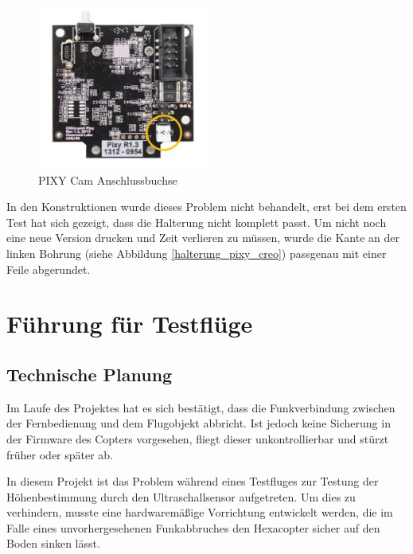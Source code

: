 			\begin{figure}[H]
			\begin{centering}
			\includegraphics[width = 0.5\textwidth]{Bilder/PIXY_Cam_Hinterseite}
			\par\end{centering}
			\caption[PIXY Cam Anschlussbuchse]{PIXY Cam Anschlussbuchse\cite{PIXY_Cmu_cam5}}
			\label{PIXY_Cam_Hinterseite}
			\end{figure}

	In den Konstruktionen wurde dieses Problem nicht behandelt, erst bei dem ersten Test hat sich gezeigt, dass die Halterung nicht komplett passt.
	Um nicht noch eine neue Version drucken und Zeit verlieren zu müssen, wurde die Kante an der linken Bohrung (siehe Abbildung \ref{halterung_pixy_creo}) passgenau mit einer Feile abgerundet.

			\newpage

\section{Führung für Testflüge}

	\subsection{Technische Planung}

	Im Laufe des Projektes hat es sich bestätigt, dass die Funkverbindung zwischen der Fernbedienung und dem Flugobjekt abbricht.
	Ist jedoch keine Sicherung in der Firmware des Copters vorgesehen, fliegt dieser unkontrollierbar und stürzt früher oder später ab.

	In diesem Projekt ist das Problem während eines Testfluges zur Testung der Höhenbestimmung durch den Ultraschallsensor aufgetreten.
	Um dies zu verhindern, musste eine hardwaremäßige Vorrichtung entwickelt werden, die im Falle eines unvorhergesehenen Funkabbruches den Hexacopter sicher auf den Boden sinken lässt.

